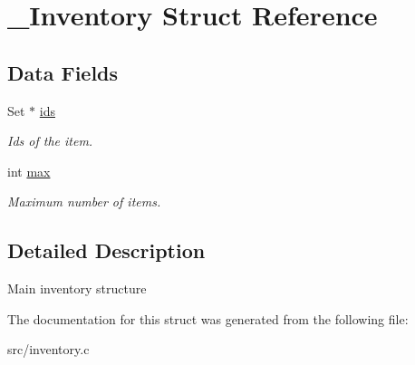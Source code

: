 \hypertarget{struct__Inventory}{}\section{\+\_\+\+Inventory Struct Reference}
\label{struct__Inventory}
\subsection*{Data Fields}
\begin{DoxyCompactItemize}
\item 
\mbox{\label{struct__Inventory_a7f6b5d7d1111e7e8f8999c656ae27d0c}} 
Set $\ast$ \hyperlink{struct__Inventory_a7f6b5d7d1111e7e8f8999c656ae27d0c}{ids}
\begin{DoxyCompactList}\small\item\em Ids of the item. \end{DoxyCompactList}\item 
\mbox{\label{struct__Inventory_ac09bcf212b2c7ff348066b2e5f28bb9c}} 
int \hyperlink{struct__Inventory_ac09bcf212b2c7ff348066b2e5f28bb9c}{max}
\begin{DoxyCompactList}\small\item\em Maximum number of items. \end{DoxyCompactList}\end{DoxyCompactItemize}


\subsection{Detailed Description}
Main inventory structure 

The documentation for this struct was generated from the following file\+:\begin{DoxyCompactItemize}
\item 
src/inventory.\+c\end{DoxyCompactItemize}
